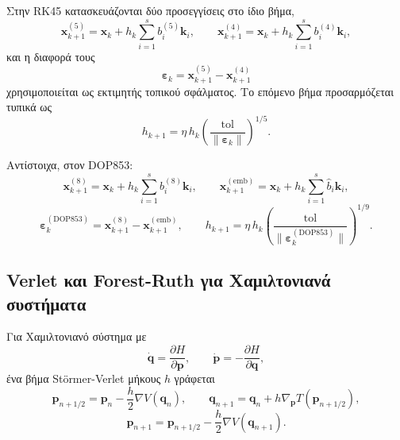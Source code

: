 \documentclass[11pt,a4paper]{report}
\begin{document}
Στην RK45 κατασκευάζονται δύο προσεγγίσεις στο ίδιο βήμα,
\begin{equation}
\mathbf{x}_{k+1}^{(5)}=\mathbf{x}_k+h_k\sum_{i=1}^{s}b_i^{(5)}\mathbf{k}_i,
\qquad
\mathbf{x}_{k+1}^{(4)}=\mathbf{x}_k+h_k\sum_{i=1}^{s}b_i^{(4)}\mathbf{k}_i,
\end{equation}
και η διαφορά τους
\begin{equation}
\boldsymbol{\varepsilon}_k=\mathbf{x}_{k+1}^{(5)}-\mathbf{x}_{k+1}^{(4)}
\end{equation}
χρησιμοποιείται ως εκτιμητής τοπικού σφάλματος. Το επόμενο βήμα προσαρμόζεται
τυπικά ως
\begin{equation}
h_{k+1}=\eta\,h_k\left(\frac{\mathrm{tol}}{\|\boldsymbol{\varepsilon}_k\|}\right)^{\!1/5}.
\end{equation}

Αντίστοιχα, στον DOP853:
\begin{equation}
\mathbf{x}_{k+1}^{(8)}=\mathbf{x}_k+h_k\sum_{i=1}^{s}b_i^{(8)}\mathbf{k}_i,
\qquad
\mathbf{x}_{k+1}^{(\mathrm{emb})}=\mathbf{x}_k+h_k\sum_{i=1}^{s}\widehat b_i\mathbf{k}_i,
\end{equation}
\begin{equation}
\boldsymbol{\varepsilon}_k^{\mathrm{(DOP853)}}=
\mathbf{x}_{k+1}^{(8)}-\mathbf{x}_{k+1}^{(\mathrm{emb})},
\qquad
h_{k+1}=\eta\,h_k\left(\frac{\mathrm{tol}}{\|\boldsymbol{\varepsilon}_k^{\mathrm{(DOP853)}}\|}\right)^{\!1/9}.
\end{equation}

\subsection{Verlet και Forest-Ruth για Χαμιλτονιανά συστήματα}
\label{app:symplectic-formulas}
Για Χαμιλτονιανό σύστημα με
\begin{equation}
\dot{\mathbf{q}}=\frac{\partial H}{\partial \mathbf{p}},\qquad
\dot{\mathbf{p}}=-\frac{\partial H}{\partial \mathbf{q}},
\end{equation}
ένα βήμα St\"ormer-Verlet μήκους $h$ γράφεται
\begin{equation}
\mathbf{p}_{n+1/2}=\mathbf{p}_n-\frac{h}{2}\nabla V(\mathbf{q}_n),
\qquad
\mathbf{q}_{n+1}=\mathbf{q}_n+h\nabla_{\mathbf{p}}T(\mathbf{p}_{n+1/2}),
\end{equation}
\begin{equation}
\mathbf{p}_{n+1}=\mathbf{p}_{n+1/2}-\frac{h}{2}\nabla V(\mathbf{q}_{n+1}).
\end{equation}
\end{document}
